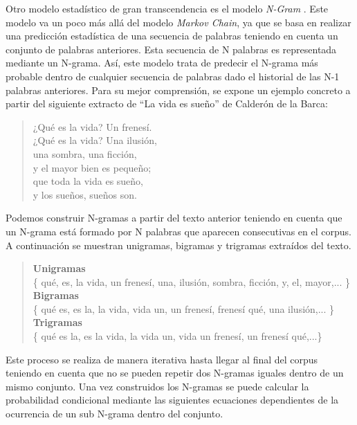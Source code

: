 Otro modelo estadístico de gran transcendencia es el modelo \textit{N-Gram} \citep{jurafsky-2008}. Este modelo va un poco más allá del modelo \textit{Markov Chain}, ya que se basa en realizar una predicción estadística de una secuencia de palabras teniendo en cuenta un conjunto de palabras anteriores. Esta secuencia de N palabras es representada mediante un N-grama.
Así, este modelo trata de predecir el N-grama más probable dentro de cualquier secuencia de palabras dado el historial de las N-1 palabras anteriores. Para su mejor comprensión, se expone un ejemplo concreto a partir del siguiente extracto de ``La vida es sueño'' de Calderón de la Barca:

\begin{verse}
	¿Qué es la vida? Un frenesí.\\
	¿Qué es la vida? Una ilusión,\\
	una sombra, una ficción,\\
	y el mayor bien es pequeño;\\
	que toda la vida es sueño,\\
	y los sueños, sueños son.\\
\end{verse}

Podemos construir N-gramas a partir del texto anterior teniendo en cuenta que un N-grama está formado por N palabras que aparecen consecutivas en el corpus. A continuación se muestran unigramas, bigramas y trigramas extraídos del texto.

\begin{verse}
	\textbf{Unigramas} \\
	\{ qué, es, la vida, un frenesí, una, ilusión, sombra, ficción, y, el, mayor,... \}\\
	\textbf{Bigramas} \\
	\{ qué es, es la, la vida, vida un, un frenesí, frenesí qué, una ilusión,... \}\\
	\textbf{Trigramas} \\
	\{ qué es la, es la vida, la vida un, vida un frenesí, un frenesí qué,...\}
\end{verse}


Este proceso se realiza de manera iterativa hasta llegar al final del corpus teniendo en cuenta que no se pueden repetir dos N-gramas iguales dentro de un mismo conjunto. Una vez construidos los N-gramas se puede calcular la probabilidad condicional mediante las siguientes ecuaciones dependientes de la ocurrencia de un sub N-grama dentro del conjunto.

